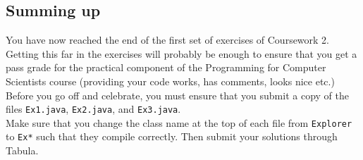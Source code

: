 \subsection{Summing up}

You have now reached the end of the first set of exercises of Coursework 2.
Getting this far in the exercises will probably be enough to ensure that you
get a pass grade for the practical component of the
Programming for Computer Scientists course (providing your
code works, has comments, looks nice etc.)
Before you go off and celebrate, you must ensure that you 
submit a copy of the files {\tt Ex1.java}, {\tt Ex2.java}, and {\tt Ex3.java}.  \\

\noindent
Make sure that you change the class name at the top of each file from 
{\tt Explorer} to {\tt Ex*} such that they compile correctly. Then submit your
solutions through Tabula.
